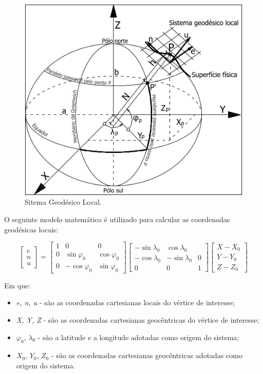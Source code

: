\begin{figure}[H]
\centering
\includegraphics[scale=0.7]{img/sgl.png} %
\caption{Sitema Geodésico Local. \citep{ibge_imoveis}}
\label{Rotulo}
\end{figure}

O seguinte modelo matemático é utilizado para calcular as coordenadas geodésicas locais:

\small
\begin{equation}
\label{sgl_mod_mat}
\begin{bmatrix}
e\\
n\\
u
\end{bmatrix}
=
\begin{bmatrix}
1 & 0 & 0\\
0 & \sin{\varphi_0} & \cos{\varphi_0}\\
0 & -\cos{\varphi_0} & \sin{\varphi_0}
\end{bmatrix}
\begin{bmatrix}
-\sin{\lambda_0} & \cos{\lambda_0}\\
-\cos{\lambda_0} & -\sin{\lambda_0} & 0\\
0 & 0 & 1
\end{bmatrix}
\begin{bmatrix}
X-X_0\\
Y-Y_0\\
Z-Z_0
\end{bmatrix}
\end{equation}
\normalsize

Em que:
\begin{itemize}
    \item \textit{e, n, u} - são as coordenadas cartesianas locais do vértice de interesse;
    \item \textit{X, Y, Z} - são as coordenadas cartesianas geocêntricas do vértice de interesse;
    \item $\varphi_0$, $\lambda_0$ - são a latitude e a longitude adotadas como origem do sistema;
    \item $X_0$, $Y_0$, $Z_0$ - são as coordenadas cartesianas geocêntricas adotadas como origem do sistema.
\end{itemize}